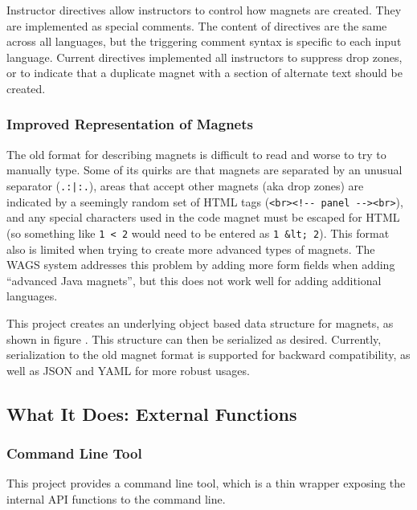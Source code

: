 \documentclass[letter,10pt]{article}
\begin{document}
Instructor directives allow instructors to control how magnets are 
created. They are implemented as special comments. The 
content of directives are the same across all languages, but the 
triggering comment syntax is specific to each input language. Current 
directives implemented all instructors to suppress drop zones, or to 
indicate that a duplicate magnet with a section of alternate text 
should be created.

\subsubsection{Improved Representation of Magnets}

The old format for describing magnets is difficult to read and worse to 
try to manually type. Some of its quirks are that magnets are separated 
by an unusual separator (\verb~.:|:.~), areas that accept other magnets 
(aka drop zones) are indicated by a seemingly random set of HTML tags 
(\verb~<br><!-- panel --><br>~), and any special characters used in the 
code magnet must be escaped for HTML (so something like \verb~1 < 2~ 
would need to be entered as \verb~1 &lt; 2~). This format also is 
limited when trying to create more advanced types of magnets. The WAGS 
system addresses this problem by adding more form fields when adding 
``advanced Java magnets'', but this does not work well for adding 
additional languages.


This project creates an underlying object based data structure for 
magnets, as shown in figure . This 
structure can then be serialized as desired. Currently, serialization to 
the old magnet format is supported for backward compatibility, as well 
as JSON and YAML for more robust usages.



\subsection{What It Does: External Functions}

\subsubsection{Command Line Tool}

This project provides a command line tool, which is a thin wrapper 
exposing the internal API functions to the command line.
\end{document}
